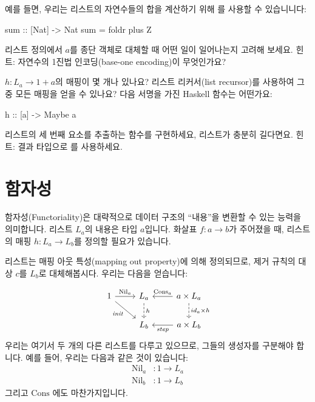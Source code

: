 \documentclass[DaoFP]{subfiles}
\begin{document}
예를 들면, 우리는 리스트의 자연수들의 합을 계산하기 위해 를 사용할 수 있습니니다:
\begin{haskell}
sum :: [Nat] -> Nat
sum = foldr plus Z
\end{haskell}


\begin{exercise}
리스트 정의에서 $a$를 종단 객체로 대체할 때 어떤 일이 일어나는지 고려해 보세요. 힌트: 자연수의 1진법 인코딩(base-one encoding)이 무엇인가요?
\end{exercise}
\begin{exercise}
$h \colon L_a \to 1 + a$의 매핑이 몇 개나 있나요? 리스트 리커서(list recursor)를 사용하여 그 중 모든 매핑을 얻을 수 있나요? 다음 서명을 가진 Haskell 함수는 어떤가요:
\begin{haskell}
h :: [a] -> Maybe a
\end{haskell}
\end{exercise}
\begin{exercise}
리스트의 세 번째 요소를 추출하는 함수를 구현하세요, 리스트가 충분히 길다면요. 힌트: 결과 타입으로 를 사용하세요.
\end{exercise}

\section{함자성}

함자성(Functoriality)은 대략적으로 데이터 구조의 ``내용''을 변환할 수 있는 능력을 의미합니다. 리스트 $L_a$의 내용은 타입 $a$입니다. 화살표 $f \colon a \to b$가 주어졌을 때, 리스트의 매핑 $h \colon L_a \to L_b$를 정의할 필요가 있습니다.

리스트는 매핑 아웃 특성(mapping out property)에 의해 정의되므로, 제거 규칙의 대상 $c$를 $L_b$로 대체해봅시다. 우리는 다음을 얻습니다:

\[
 \begin{tikzcd}
 1
 \arrow[r, "\text{Nil}_a"]
 \arrow[rd, "\mathit{init}"']
 &L_a
\arrow[d, dashed, "h"]
&a \times L_a
  \arrow[l, "\text{Cons}_a"']
\arrow[d, dashed, "id_a \times h"]
\\
& L_b
& a \times L_b
\arrow[l, "\mathit{step}"]
  \end{tikzcd}
\]
우리는 여기서 두 개의 다른 리스트를 다루고 있으므로, 그들의 생성자를 구분해야 합니다. 예를 들어, 우리는 다음과 같은 것이 있습니다:
\begin{align*}
\text{Nil}_a &\colon 1 \to L_a \\
\text{Nil}_b &\colon 1 \to L_b 
\end{align*}
그리고 $\text{Cons}$ 에도 마찬가지입니다.
\end{document}
